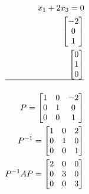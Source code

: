 \documentclass[12pt, a4paper]{article}
\begin{document}
\begin{align*}
				x_1+2x_3=0\\
				\begin{bmatrix}-2\\0\\1\end{bmatrix}\\
				\begin{bmatrix}0\\1\\0\end{bmatrix}\\
				\hline\\
				P=\begin{bmatrix}1&0&-2\\0&1&0\\0&0&1\end{bmatrix}\\
				P^{-1}=\begin{bmatrix}1&0&2\\0&1&0\\0&0&1\end{bmatrix}\\
				P^{-1}AP=\begin{bmatrix}2&0&0\\0&3&0\\0&0&3\end{bmatrix}
			\end{align*}
\end{document}
